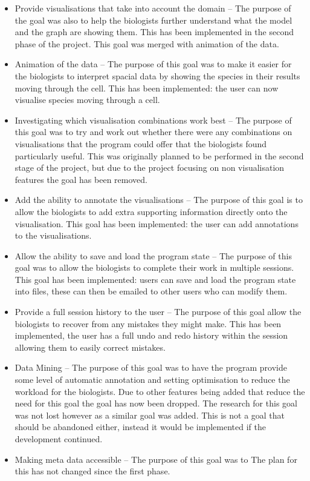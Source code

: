 \begin{itemize}
\item Provide visualisations that take into account the domain -- The purpose of the goal was also to help the biologists further understand what the model and the graph are showing them. This has been implemented in the second phase of the project.  This goal was merged with animation of the data.
\item Animation of the data -- The purpose of this goal was to make it easier for the biologists to interpret spacial data by showing the species in their results moving through the cell.  This has been implemented: the user can now visualise species moving through a cell.
\item Investigating which visualisation combinations work best -- The purpose of this goal was to try and work out whether there were any combinations on visualisations that the program could offer that the biologists found particularly useful.  This was originally planned to be performed in the second stage of the project, but due to the project focusing on non visualisation features the goal has been removed.
\item Add the ability to annotate the visualisations -- The purpose of this goal is to allow the biologists to add extra supporting information directly onto the visualisation. This goal has been implemented: the user can add annotations to the visualisations.
\item Allow the ability to save and load the program state -- The purpose of this goal was to allow the biologists to complete their work in multiple sessions. This goal has been implemented: users can save and load the program state into files, these can then be emailed to other users who can modify them.
\item Provide a full session history to the user -- The purpose of this goal allow the biologists to recover from any mistakes they might make. This has been implemented, the user has a full undo and redo history within the session allowing them to easily correct mistakes.
\item Data Mining -- The purpose of this goal was to have the program provide some level of automatic annotation and setting optimisation to reduce the workload for the biologists.  Due to other features being added that reduce the need for this goal the goal has now been dropped.  The research for this goal was not lost however as a similar goal was added.  This is not a goal that should be abandoned either, instead it would be implemented if the development continued.
\item Making meta data accessible -- The purpose of this goal was to The plan for this has not changed since the first phase.
\end{itemize}

